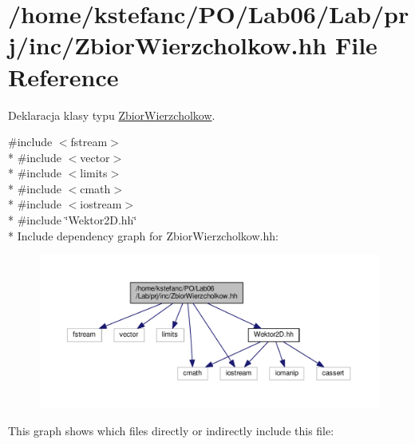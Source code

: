 \hypertarget{_zbior_wierzcholkow_8hh}{\section{/home/kstefanc/\+P\+O/\+Lab06/\+Lab/prj/inc/\+Zbior\+Wierzcholkow.hh File Reference}
\label{_zbior_wierzcholkow_8hh}
}


Deklaracja klasy typu \hyperlink{class_zbior_wierzcholkow}{Zbior\+Wierzcholkow}.  


{\ttfamily \#include $<$fstream$>$}\\*
{\ttfamily \#include $<$vector$>$}\\*
{\ttfamily \#include $<$limits$>$}\\*
{\ttfamily \#include $<$cmath$>$}\\*
{\ttfamily \#include $<$iostream$>$}\\*
{\ttfamily \#include \char`\"{}Wektor2\+D.\+hh\char`\"{}}\\*
Include dependency graph for Zbior\+Wierzcholkow.\+hh\+:\nopagebreak
\begin{figure}[H]
\begin{center}
\leavevmode
\includegraphics[width=350pt]{_zbior_wierzcholkow_8hh__incl}
\end{center}
\end{figure}
This graph shows which files directly or indirectly include this file\+:\nopagebreak
